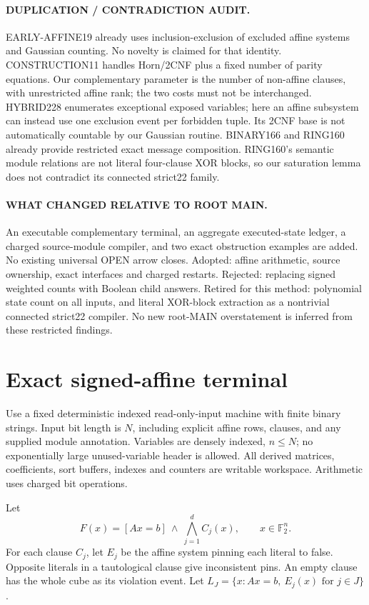 \documentclass[11pt]{article}
\newcommand{\F}{\mathbb F_2}
\begin{document}
\paragraph{DUPLICATION / CONTRADICTION AUDIT.}
EARLY-AFFINE19 already uses inclusion-exclusion of excluded affine systems
and Gaussian counting. No novelty is claimed for that identity.
CONSTRUCTION11 handles Horn/2CNF plus a fixed number of parity equations.
Our complementary parameter is the number of non-affine clauses, with
unrestricted affine rank; the two costs must not be interchanged.
HYBRID228 enumerates exceptional exposed variables; here an affine subsystem
can instead use one exclusion event per forbidden tuple. Its 2CNF base is
not automatically countable by our Gaussian routine.
BINARY166 and RING160 already provide restricted exact message composition.
RING160's semantic module relations are not literal four-clause XOR blocks,
so our saturation lemma does not contradict its connected strict22 family.

\paragraph{WHAT CHANGED RELATIVE TO ROOT MAIN.}
An executable complementary terminal, an aggregate executed-state ledger,
a charged source-module compiler, and two exact obstruction examples are added.
No existing universal OPEN arrow closes. Adopted: affine arithmetic,
source ownership, exact interfaces and charged restarts.
Rejected: replacing signed weighted counts with Boolean child answers.
Retired for this method: polynomial state count on all inputs, and literal
XOR-block extraction as a nontrivial connected strict22 compiler.
No new root-MAIN overstatement is inferred from these restricted findings.

\section{Exact signed-affine terminal}
Use a fixed deterministic indexed read-only-input machine with finite
binary strings. Input bit length is $N$, including explicit affine rows,
clauses, and any supplied module annotation. Variables are densely indexed,
$n\le N$; no exponentially large unused-variable header is allowed.
All derived matrices, coefficients, sort buffers, indexes and counters
are writable workspace. Arithmetic uses charged bit operations.

Let
\[
 F(x)=[Ax=b]\ \land\ \bigwedge_{j=1}^d C_j(x),
 \qquad x\in\F^n.
\]
For each clause $C_j$, let $E_j$ be the affine system pinning each literal
to false. Opposite literals in a tautological clause give inconsistent pins.
An empty clause has the whole cube as its violation event. Let
$L_J=\{x:Ax=b,\ E_j(x)\text{ for }j\in J\}$.
\end{document}
